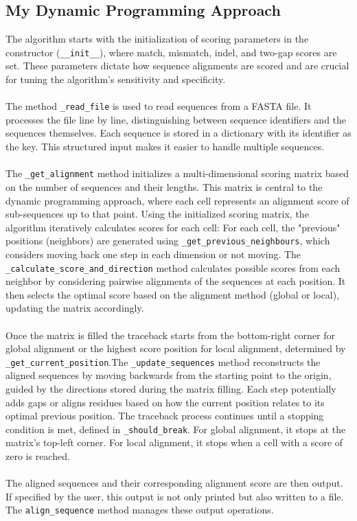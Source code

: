 \documentclass{article}
\begin{document}
\subsection{My Dynamic Programming Approach}
The algorithm starts with the initialization of scoring parameters in the constructor (\texttt{\_\_init\_\_}), where match, mismatch, indel, and two-gap scores are set. These parameters dictate how sequence alignments are scored and are crucial for tuning the algorithm's sensitivity and specificity.\\
\\
The method \texttt{\_read\_file} is used to read sequences from a FASTA file. It processes the file line by line, distinguishing between sequence identifiers and the sequences themselves. Each sequence is stored in a dictionary with its identifier as the key. This structured input makes it easier to handle multiple sequences.\\
\\
The \texttt{\_get\_alignment} method initializes a multi-dimensional scoring matrix based on the number of sequences and their lengths. This matrix is central to the dynamic programming approach, where each cell represents an alignment score of sub-sequences up to that point. Using the initialized scoring matrix, the algorithm iteratively calculates scores for each cell: For each cell, the "previous" positions (neighbors) are generated using \texttt{\_get\_previous\_neighbours}, which considers moving back one step in each dimension or not moving. The \texttt{\_calculate\_score\_and\_direction} method calculates possible scores from each neighbor by considering pairwise alignments of the sequences at each position. It then selects the optimal score based on the alignment method (global or local), updating the matrix accordingly.\\
\\
 Once the matrix is filled the traceback starts from the bottom-right corner for global alignment or the highest score position for local alignment, determined by \texttt{\_get\_current\_position}.The \texttt{\_update\_sequences} method reconstructs the aligned sequences by moving backwards from the starting point to the origin, guided by the directions stored during the matrix filling. Each step potentially adds gaps or aligns residues based on how the current position relates to its optimal previous position. The traceback process continues until a stopping condition is met, defined in \texttt{\_should\_break}. For global alignment, it stops at the matrix's top-left corner. For local alignment, it stops when a cell with a score of zero is reached.\\
 \\
 The aligned sequences and their corresponding alignment score are then output. If specified by the user, this output is not only printed but also written to a file. The \texttt{align\_sequence} method manages these output operations.
\end{document}
